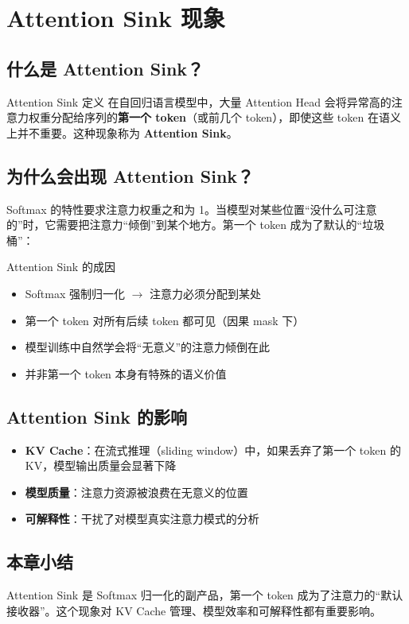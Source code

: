 \section{Attention Sink 现象}

\subsection{什么是 Attention Sink？}

\begin{importantbox}{Attention Sink 定义}
在自回归语言模型中，大量 Attention Head 会将异常高的注意力权重分配给序列的\textbf{第一个 token}（或前几个 token），即使这些 token 在语义上并不重要。这种现象称为 \textbf{Attention Sink}。
\end{importantbox}

\subsection{为什么会出现 Attention Sink？}

Softmax 的特性要求注意力权重之和为 1。当模型对某些位置``没什么可注意的''时，它需要把注意力``倾倒''到某个地方。第一个 token 成为了默认的``垃圾桶''：

\begin{warningbox}{Attention Sink 的成因}
\begin{itemize}
  \item Softmax 强制归一化 $\to$ 注意力必须分配到某处
  \item 第一个 token 对所有后续 token 都可见（因果 mask 下）
  \item 模型训练中自然学会将``无意义''的注意力倾倒在此
  \item 并非第一个 token 本身有特殊的语义价值
\end{itemize}
\end{warningbox}

\subsection{Attention Sink 的影响}

\begin{itemize}
  \item \textbf{KV Cache}：在流式推理（sliding window）中，如果丢弃了第一个 token 的 KV，模型输出质量会显著下降
  \item \textbf{模型质量}：注意力资源被浪费在无意义的位置
  \item \textbf{可解释性}：干扰了对模型真实注意力模式的分析
\end{itemize}

\subsection{本章小结}

Attention Sink 是 Softmax 归一化的副产品，第一个 token 成为了注意力的``默认接收器''。这个现象对 KV Cache 管理、模型效率和可解释性都有重要影响。

